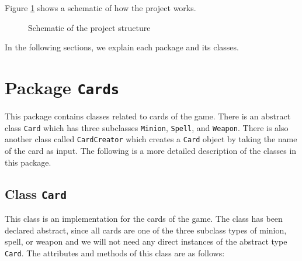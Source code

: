 \documentclass[a4paper]{article}
\begin{document}
Figure \ref{fig01} shows a schematic of how the project works.

\begin{figure}[h!]
	\centering
	\caption{Schematic of the project structure}
	\label{fig01}
\end{figure}

In the following sections, we explain each package and its classes.




\clearpage
\section{Package \texttt{Cards}}
This package contains classes related to cards of the game. There is an abstract class \texttt{Card} which has three subclasses \texttt{Minion}, \texttt{Spell}, and \texttt{Weapon}. There is also another class called \texttt{CardCreator} which creates a \texttt{Card} object by taking the name of the card as input. The following is a more detailed description of the classes in this package.
\subsection{Class \texttt{Card}}
This class is an implementation for the cards of the game. The class has been declared abstract, since all cards are one of the three subclass types of minion, spell, or weapon and we will not need any direct instances of the abstract type \texttt{Card}. The attributes and methods of this class are as follows:
\end{document}
